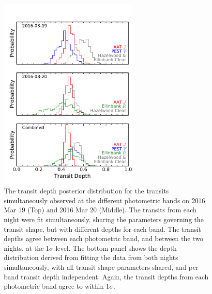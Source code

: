 \documentclass[useAMS,usenatbib]{mn2e}
\begin{document}
\begin{figure}
    \centering
    \includegraphics[width=7cm]{plots/depth_hist.pdf}
    \caption{The transit depth posterior distribution for the transits simultaneously observed at the different photometric bands on 2016 Mar 19 (Top) and 2016 Mar 20 (Middle). The transits from each night were fit simultaneously, sharing the parameters governing the transit shape, but with different depths for each band. The transit depths agree between each photometric band, and between the two nights, at the $1\sigma$ level. The bottom panel shows the depth distribution derived from fitting the data from both nights simultaneously, with all transit shape parameters shared, and per-band transit depth independent. Again, the transit depths from each photometric band agree to within $1\sigma$.}
    \label{fig:depth_hist}
\end{figure}
\end{document}

